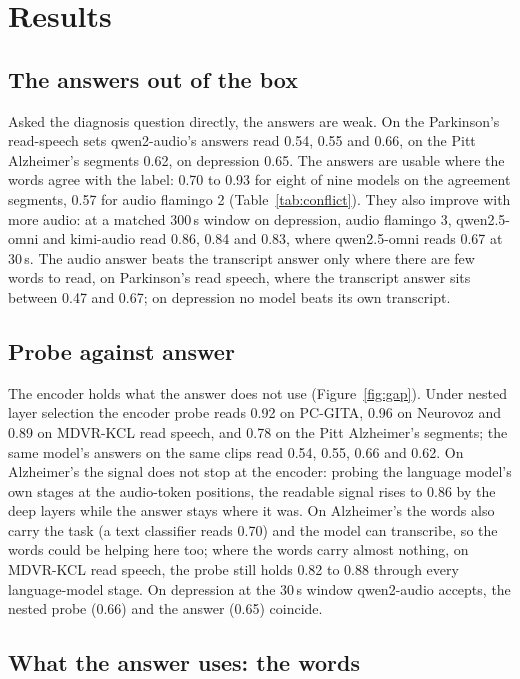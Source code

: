 \documentclass{article}
\begin{document}
\section{Results}\label{sec:results}

\subsection{The answers out of the box}

Asked the diagnosis question directly, the answers are weak. On the Parkinson's read-speech
sets qwen2-audio's answers read 0.54, 0.55 and 0.66, on the Pitt Alzheimer's segments 0.62, on
depression 0.65. The answers are usable where the words agree with the label: 0.70 to 0.93 for
eight of nine models on the agreement segments, 0.57 for audio flamingo 2 (Table~\ref{tab:conflict}).
They also improve with more audio: at a matched 300\,s window on depression, audio flamingo 3,
qwen2.5-omni and kimi-audio read 0.86, 0.84 and 0.83, where qwen2.5-omni reads 0.67 at 30\,s. The
audio answer beats the transcript answer only where there are few words to read, on Parkinson's read
speech, where the transcript answer sits between 0.47 and 0.67; on depression no model beats its own
transcript.

\subsection{Probe against answer}\label{sec:gap}

The encoder holds what the answer does not use (Figure~\ref{fig:gap}). Under nested layer selection the encoder probe reads
0.92 on PC-GITA, 0.96 on Neurovoz and 0.89 on MDVR-KCL read speech, and 0.78 on the Pitt
Alzheimer's segments; the same model's answers on the same clips read
0.54, 0.55, 0.66 and 0.62. On Alzheimer's the signal does not stop at the encoder: probing the
language model's own stages at the audio-token positions, the readable signal rises to 0.86 by the
deep layers while the answer stays where it was. On Alzheimer's the words also carry the task (a
text classifier reads 0.70) and the model can transcribe, so the words could be helping here too; where
the words carry almost nothing, on MDVR-KCL read speech, the probe still holds 0.82 to 0.88 through
every language-model stage. On depression at the 30\,s window qwen2-audio accepts, the nested probe
(0.66) and the answer (0.65) coincide.

\subsection{What the answer uses: the words}
\end{document}

